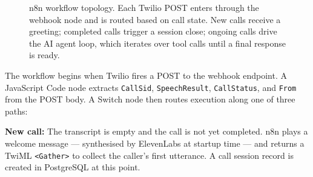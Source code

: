 \documentclass[conference]{IEEEtran}
\begin{document}
\begin{figure}[!t]
\caption{n8n workflow topology. Each Twilio POST enters through the webhook
node and is routed based on call state. New calls receive a greeting;
completed calls trigger a session close; ongoing calls drive the AI agent
loop, which iterates over tool calls until a final response is ready.}
\label{fig:n8n}
\end{figure}

The workflow begins when Twilio fires a POST to the webhook endpoint. A
JavaScript Code node extracts \texttt{CallSid}, \texttt{SpeechResult},
\texttt{CallStatus}, and \texttt{From} from the POST body. A Switch node
then routes execution along one of three paths:

\textbf{New call:} The transcript is empty and the call is not yet completed.
n8n plays a welcome message — synthesised by ElevenLabs at startup time —
and returns a TwiML \texttt{<Gather>} to collect the caller's first utterance.
A call session record is created in PostgreSQL at this point.
\end{document}
